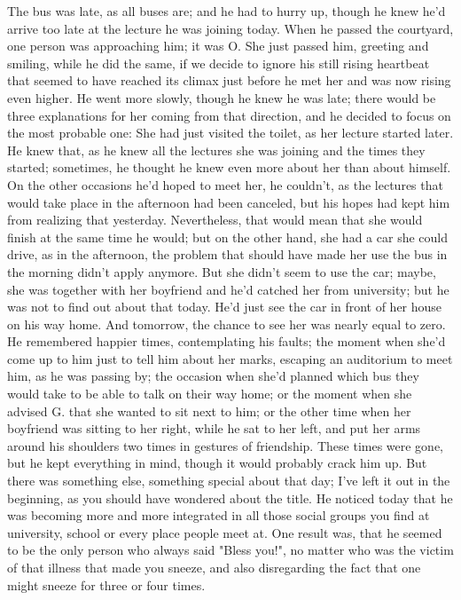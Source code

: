 The bus was late, as all buses are; and he had to hurry up, though he knew he'd arrive too late at the lecture he was joining today. 
When he passed the courtyard, one person was approaching him; it was O.
She just passed him, greeting and smiling, while he did the same, if we decide to ignore his still rising heartbeat that seemed to have reached its climax just before he met her and was now rising even higher. He went more slowly, though he knew he was late; there would be three explanations for her coming from that direction, and he decided to focus on the most probable one: She had just visited the toilet, as her lecture started later. 
He knew that, as he knew all the lectures she was joining and the times they started; sometimes, he thought he knew even more about her than about himself. 
On the other occasions he'd hoped to meet her, he couldn't, as the lectures that would take place in the afternoon had been canceled, but his hopes had kept him from realizing that yesterday. 
Nevertheless, that would mean that she would finish at the same time he would; but on the other hand, she had a car she could drive, as in the afternoon, the problem that should have made her use the bus in the morning didn't apply anymore. 
But she didn't seem to use the car; maybe, she was together with her boyfriend and he'd catched her from university; but he was not to find out about that today. 
He'd just see the car in front of her house on his way home. 
And tomorrow, the chance to see her was nearly equal to zero. 
He remembered happier times, contemplating his faults; the moment when she'd come up to him just to tell him about her marks, escaping an auditorium to meet him, as he was passing by; the occasion when she'd planned which bus they would take to be able to talk on their way home; or the moment when she advised G. that she wanted to sit next to him; or the other time when her boyfriend was sitting to her right, while he sat to her left, and put her arms around his shoulders two times in gestures of friendship. 
These times were gone, but he kept everything in mind, though it would probably crack him up. 
But there was something else, something special about that day; I've left it out in the beginning, as you should have wondered about the title. 
He noticed today that he was becoming more and more integrated in all those social groups you find at university, school or every place people meet at. 
One result was, that he seemed to be the only person who always said "Bless you!", no matter who was the victim of that illness that made you sneeze, and also disregarding the fact that one might sneeze for three or four times. 
